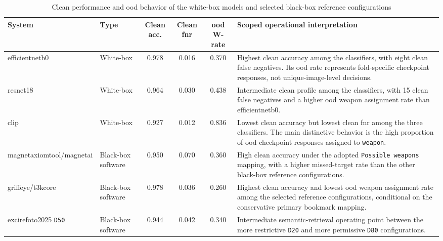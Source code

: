 \begin{table}[!htbp]
\centering
\caption{Clean performance and \gls{ood} behavior of the white-box models and
selected black-box reference configurations}
\label{tab:results-comparative-clean-ood}

\footnotesize
\renewcommand{\arraystretch}{1.10}
\setlength{\tabcolsep}{2.2pt}

\begin{tabularx}{\textwidth}{@{}
>{\raggedright\arraybackslash}p{2.35cm}
>{\raggedright\arraybackslash}p{1.45cm}
c c c
>{\raggedright\arraybackslash}X
@{}}
\toprule
\textbf{System} &
\textbf{Type} &
\textbf{Clean acc.} &
\textbf{Clean \acrshort{fnr}} &
\textbf{\acrshort{ood} W-rate} &
\textbf{Scoped operational interpretation} \\
\midrule

\gls{efficientnetb0}
& White-box
& 0.978
& 0.016
& 0.370
& Highest clean accuracy among the classifiers, with eight clean false
negatives. Its \gls{ood} rate represents fold-specific checkpoint responses,
not unique-image-level decisions. \\

\gls{resnet18}
& White-box
& 0.964
& 0.030
& 0.438
& Intermediate clean profile among the classifiers, with 15 clean false
negatives and a higher \gls{ood} weapon assignment rate than \gls{efficientnetb0}. \\

\gls{clip}
& White-box
& 0.927
& 0.012
& 0.836
& Lowest clean accuracy but lowest clean \gls{fnr} among the three classifiers. The main
distinctive behavior is the high proportion of \gls{ood} checkpoint responses
assigned to \texttt{weapon}. \\

\gls{magnetaxiomtool}/\gls{magnetai}
& Black-box software
& 0.950
& 0.070
& 0.360
& High clean accuracy under the adopted \texttt{Possible weapons} mapping, with
a higher missed-target rate than the other black-box reference configurations. \\

\gls{griffeye}/\gls{t3kcore}
& Black-box software
& 0.978
& 0.036
& 0.260
& Highest clean accuracy and lowest \gls{ood} weapon assignment rate among the
selected reference configurations, conditional on the conservative primary
bookmark mapping. \\

\gls{excirefoto2025} \texttt{D50}
& Black-box software
& 0.944
& 0.042
& 0.340
& Intermediate semantic-retrieval operating point between the more restrictive
\texttt{D20} and more permissive \texttt{D80} configurations. \\


\end{tabularx}
\end{table}
